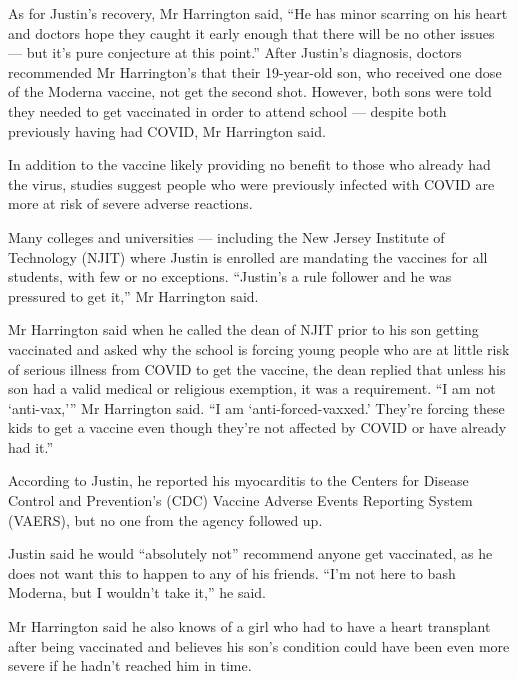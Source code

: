{As for Justin’s recovery, Mr Harrington said, “He has minor scarring on his
heart and doctors hope they caught it early enough that there will be no other
issues — but it’s pure conjecture at this point.” After Justin’s diagnosis,
doctors recommended Mr Harrington’s that their 19-year-old son, who received one
dose of the Moderna vaccine, not get the second shot. However, both sons were
told they needed to get vaccinated in order to attend school — despite both
previously having had COVID, Mr Harrington said.

In addition to the vaccine likely providing no benefit to those who already had
the virus, studies suggest people who were previously infected with COVID are
more at risk of severe adverse reactions.

Many colleges and universities — including the New Jersey Institute of
Technology (NJIT) where Justin is enrolled are mandating the vaccines for all
students, with few or no exceptions. “Justin’s a rule follower and he was
pressured to get it,” Mr Harrington said.

Mr Harrington said when he called the dean of NJIT prior to his son getting vaccinated and asked why the school is forcing young people who are at little risk of serious illness from COVID to get the vaccine, the dean replied that unless his son had a valid medical or religious exemption, it was a requirement.
“I am not ‘anti-vax,’” Mr Harrington said. “I am ‘anti-forced-vaxxed.’ They’re forcing these kids to get a vaccine even though they’re not affected by COVID or have already had it.”

According to Justin, he reported his myocarditis to the Centers for Disease
Control and Prevention’s (CDC) Vaccine Adverse Events Reporting System (VAERS),
but no one from the agency followed up.

Justin said he would “absolutely not” recommend anyone get vaccinated, as he
does not want this to happen to any of his friends. “I’m not here to bash
Moderna, but I wouldn’t take it,” he said.

Mr Harrington said he also knows of a girl who had to have a heart transplant
after being vaccinated and believes his son’s condition could have been even
more severe if he hadn’t reached him in time.

}
